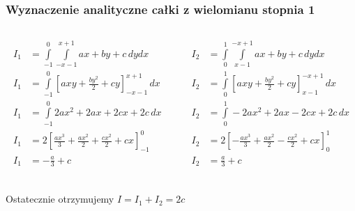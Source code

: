 \documentclass[9pt]{beamer}
\begin{document}
\begin{frame}
\frametitle{Wyznaczenie analityczne całki z wielomianu stopnia 1}
    \begin{columns}
        \begin{column}{0.5\textwidth}
            \begin{align*}
                I_1 &= \int\limits_{-1}^{0}\int\limits_{-x-1}^{x+1} ax+by+c \,dydx \\
                I_1 &= \int\limits_{-1}^{0}\left[axy + \frac{by^2}{2} + cy\right]_{-x-1}^{x+1} \,dx \\
                I_1 &= \int\limits_{-1}^{0} 2ax^2 + 2ax + 2cx + 2c \,dx \\
                I_1 &= 2\left[ \frac{ax^3}{3} + \frac{ax^2}{2} + \frac{cx^2}{2} + cx \right]_{-1}^{0} \\
                I_1 &= -\frac{a}{3} + c \\
            \end{align*}
        \end{column}
        \begin{column}{0.5\textwidth}
            \begin{align*}
                I_2 &= \int\limits_{0}^{1}\int\limits_{x-1}^{-x+1} ax+by+c \,dydx \\
                I_2 &= \int\limits_{0}^{1}\left[axy + \frac{by^2}{2} + cy\right]_{x-1}^{-x+1} \,dx \\
                I_2 &= \int\limits_{0}^{1} - 2ax^2 + 2ax - 2cx + 2c \,dx \\
                I_2 &= 2\left[ -\frac{ax^3}{3} + \frac{ax^2}{2} - \frac{cx^2}{2} + cx \right]_{0}^{1} \\
                I_2 &= \frac{a}{3} + c \\
            \end{align*}
        \end{column}
    \end{columns}

    \begin{center}
        Ostatecznie otrzymujemy $ I = I_1 + I_2 = 2c $
    \end{center}
\end{frame}
\end{document}
